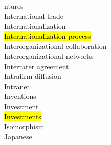 \documentclass[a4paper]{article}
\begin{document}
\begin{multicols*}{2}
\begin{footnotesize}
ntures \\ International-trade \\ Internationalization \\ \hl{Internationalization process} \\ Interorganizational collaboration \\ Interorganizational networks \\ Interrater agreement \\ Intrafirm diffusion \\ Intranet \\ Inventions \\ Investment \\ \hl{Investments} \\ Isomorphism \\ Japanese
\end{footnotesize}
\end{multicols*}
\end{document}
